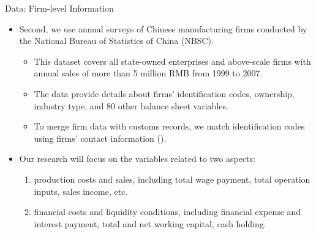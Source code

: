 \documentclass[10pt]{beamer}
\begin{document}
\begin{frame}{Data: Firm-level Information}
	\begin{itemize}
		\item Second, we use annual surveys of Chinese manufacturing firms conducted by the National Bureau of Statistics of China (NBSC).
		\begin{itemize}
			\item This dataset covers all state-owned enterprises and above-scale firms with annual sales of more than 5 million RMB from 1999 to 2007.
			\item The data provide details about firms' identification codes, ownership, industry type, and 80 other balance sheet variables.
                \item To merge firm data with customs records, we match identification codes using firms' contact information (\cite{fan2015trade}).
		\end{itemize}
            \item Our research will focus on the variables related to two aspects:
            \begin{enumerate}
                \item production costs and sales, including total wage payment, total operation inputs, sales income, etc.
                \item financial costs and liquidity conditions, including financial expense and interest payment, total and net working capital, cash holding.
            \end{enumerate}
	\end{itemize}
\end{frame}
\end{document}
